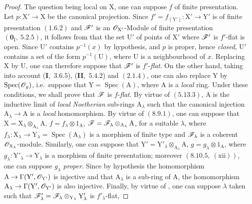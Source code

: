 \begin{proof}
The question being local on $\mathrm{X}$, one can suppose $f$ of finite presentation. Let
$p:\mathrm{X}'\to\mathrm{X}$ be the canonical projection. Since
$f'=f_{(\mathrm{Y}')}:\mathrm{X}'\to\mathrm{Y}'$ is of finite presentation
$(1.6.2)$ and $\mathscr{F}'$ is an $\mathscr{O}_{\mathrm{X}'}$-Module of finite presentation $(\mathbf{0}_\mathrm{I},~5.2.5)$, it follows
from  that the set $\mathrm{U}'$ of points of $\mathrm{X}'$ where $\mathscr{F}'$ is $f'$-flat is open. Since $\mathrm{U}'$
contains $p^{-1}(x)$ by hypothesis, and $p$ is proper, hence \emph{closed}, $\mathrm{U}'$ contains a set of the form
$p^{-1}(\mathrm{U})$, where $\mathrm{U}$ is a neighbourhood of $x$. Replacing $\mathrm{X}$ by $\mathrm{U}$, one can therefore
suppose that $\mathscr{F}'$ is $f'$-\emph{flat}. On the other hand, taking into account (\textbf{I},~$3.6.5$), (\textbf{II},~$5.4.2$)
and $(2.1.4)$, one can also replace $\mathrm{Y}$ by $\operatorname{Spec}(\mathscr{O}_y)$, i.e.\ suppose that $\mathrm{Y}=\operatorname{Spec}(\mathrm{A})$,
where $\mathrm{A}$ is a \emph{local} ring. Under these conditions, we shall prove that $\mathscr{F}$ is $f$-\emph{flat}. By virtue
of $(5.13.3)$, $\mathrm{A}$ is the inductive limit of \emph{local Noetherian} sub-rings $\mathrm{A}_\lambda$ such that
the canonical injection $\mathrm{A}_\lambda\to\mathrm{A}$ is a \emph{local} homomorphism. By virtue of $(8.9.1)$, one
can suppose that $\mathrm{X}=\mathrm{X}_\lambda\otimes_{\mathrm{A}_\lambda}\mathrm{A}$, $f=f_\lambda\otimes 1_\mathrm{A}$, $\mathscr{F}=\mathscr{F}_\lambda\otimes_{\mathrm{A}_\lambda}\mathrm{A}$,
for a suitable $\lambda$, where $f_\lambda:\mathrm{X}_\lambda\to\mathrm{Y}_\lambda=\operatorname{Spec}(\mathrm{A}_\lambda)$ is a morphism of finite type and
$\mathscr{F}_\lambda$ is a coherent $\mathscr{O}_{\mathrm{X}_\lambda}$-module.
Similarly, one can suppose that $\mathrm{Y}'=\mathrm{Y}'_\lambda\otimes_{\mathrm{A}_\lambda}\mathrm{A}$, $g=g_\lambda\otimes 1_\mathrm{A}$, where $g_\lambda:\mathrm{Y}'_\lambda\to\mathrm{Y}_\lambda$ is a
morphism of finite presentation; moreover $(8.10.5,~(\text{xii}))$, one can suppose $g_\lambda$
\emph{proper}. Since by hypothesis the homomorphism $\mathrm{A}\to\Gamma(\mathrm{Y}',\mathscr{O}_{\mathrm{Y}'})$ is injective and that $\mathrm{A}_\lambda$
is a sub-ring of $\mathrm{A}$, the homomorphism $\mathrm{A}_\lambda\to\Gamma(\mathrm{Y}',\mathscr{O}_{\mathrm{Y}'})$ is also injective. Finally,
by virtue of , one can suppose $\lambda$ taken such that $\mathscr{F}'_\lambda=\mathscr{F}_\lambda\otimes_{\mathrm{Y}_\lambda}\mathrm{Y}'_\lambda$ is $f'_\lambda$-flat,

\end{proof}
